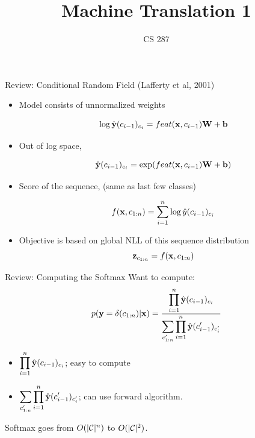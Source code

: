 \documentclass{beamer}
\title{Machine Translation 1}
\date{}
\author{CS 287}
\begin{document}
\begin{frame}
  \titlepage
\end{frame}


\begin{frame}{Review: Conditional Random Field (Lafferty et al, 2001)}
  \begin{itemize}
  \item Model consists of unnormalized weights 

    \[\log \hat{\mathbf{y}}(c_{i-1})_{c_i} = feat(\mathbf{x}, c_{i-1}) \mathbf{W} + \mathbf{b}\]
    
  \item Out of log space, 

    \[ \hat{\mathbf{y}}(c_{i-1})_{c_i} = \exp(feat(\mathbf{x}, c_{i-1}) \mathbf{W} + \mathbf{b})\]

    

  \item Score of the sequence, (same as last few classes)
    
    \[ f(\mathbf{x}, c_{1:n}) = \sum_{i=1}^n \log \hat{y}(c_{i-1})_{c_{i}} \] 

  \item Objective is based on global NLL of this sequence distribution
    \[\mathbf{z}_{c_{1:n}} =  f(\mathbf{x}, c_{1:n})    \] 

  \end{itemize}
\end{frame}

 \begin{frame}{Review: Computing the Softmax}
   Want to compute:
   \[ p(\mathbf{y}=\delta(c_{1:n}) | \mathbf{x}) = \frac{\displaystyle \prod_{i=1}^n \hat{\mathbf{y}}(c_{i-1})_{c_i}} {\displaystyle  \sum_{c'_{1:n}} \prod_{i=1}^n \hat{\mathbf{y}}(c'_{i-1})_{c'_i} }\] 

   \begin{itemize}
   \item $\displaystyle \prod_{i=1}^n \hat{\mathbf{y}}(c_{i-1})_{c_i}$; easy to compute
     \air 
   \item $\displaystyle \sum_{c'_{1:n}} \prod_{i=1}^n \hat{\mathbf{y}}(c'_{i-1})_{c'_i}$; can use forward algorithm.
   \end{itemize}

   Softmax goes from $O(|\mathcal{C}|^n)$ to $O(|\mathcal{C}|^2)$.  
 \end{frame}
\end{document}
